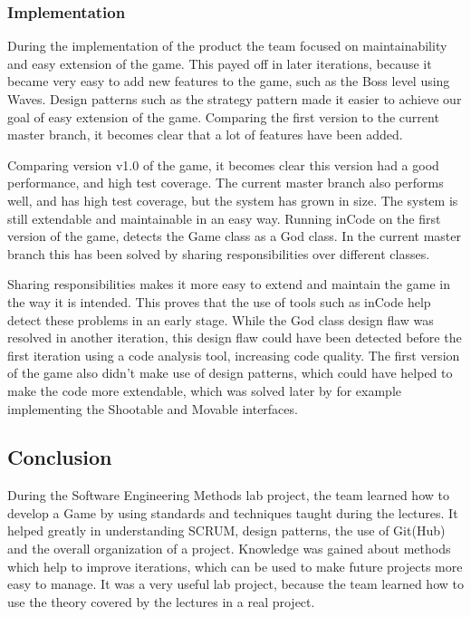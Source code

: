 \subsubsection*{Implementation}
During the implementation of the product the team focused on maintainability and easy extension of the game. This payed off in later iterations, because it became very easy to add new features to the game, such as the Boss level using Waves. Design patterns such as the strategy pattern made it easier to achieve our goal of easy extension of the game. Comparing the first version to the current master branch, it becomes clear that a lot of features have been added. 

Comparing version v1.0 of the game, it becomes clear this version had a good performance, and high test coverage. The current master branch also performs well, and has high test coverage, but the system has grown in size. The system is still extendable and maintainable in an easy way. Running inCode on the first version of the game, detects the Game class as a God class. In the current master branch this has been solved by sharing responsibilities over different classes. 

Sharing responsibilities makes it more easy to extend and maintain the game in the way it is intended. This proves that the use of tools such as inCode help detect these problems in an early stage. While the God class design flaw was resolved in another iteration, this design flaw could have been detected before the first iteration using a code analysis tool, increasing code quality. The first version of the game also didn't make use of design patterns, which could have helped to make the code more extendable, which was solved later by for example implementing the Shootable and Movable interfaces.

\newpage
\subsection*{Conclusion}
During the Software Engineering Methods lab project, the team learned how to develop a Game by using standards and techniques taught during the lectures. It helped greatly in understanding SCRUM, design patterns, the use of Git(Hub) and the overall organization of a project. Knowledge was gained about methods which help to improve iterations, which can be used to make future projects more easy to manage. It was a very useful lab project, because the team learned how to use the theory covered by the lectures in a real project.

